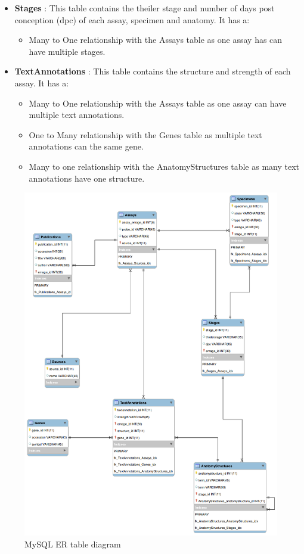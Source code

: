\begin{itemize}
\item \textbf{Stages} : This table contains the theiler stage and number of days post conception (dpc) of each assay, specimen and anatomy. It has a:
\begin{itemize}
\item Many to One relationship with the Assays table as one assay has can have multiple stages.
\end{itemize} 

\item \textbf{TextAnnotations} : This table contains the structure and strength of each assay. It has a:
\begin{itemize}
\item Many to One relationship with the Assays table as one assay can have multiple text annotations.
\item One to Many relationship with the Genes table as multiple text annotations can the same gene.
\item Many to one relationship with the AnatomyStructures table as many text annotations have one structure.
\end{itemize} 

\end{itemize}

\newpage
\begin{figure}[H]\begin{center}\includegraphics[width=1\linewidth]{images/emage_erd}\caption{MySQL ER table diagram}\label{fig:mysql}\end{center}\end{figure}

